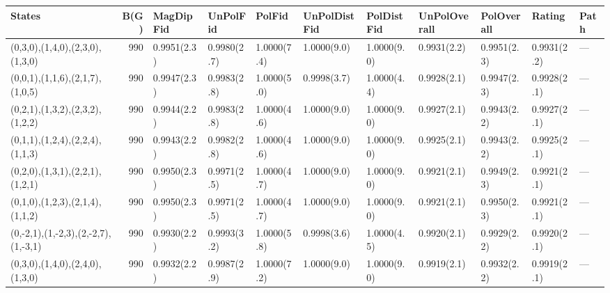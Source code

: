 \begin{tabular}{lrlllllllll}
\hline
 States                              &   B(G) & MagDipFid   & UnPolFid    & PolFid      & UnPolDistFid   & PolDistFid   & UnPolOverall   & PolOverall   & Rating      & Path   \\
\hline
 (0,3,0),(1,4,0),(2,3,0),(1,3,0)     &    990 & 0.9951(2.3) & 0.9980(2.7) & 1.0000(7.4) & 1.0000(9.0)    & 1.0000(9.0)  & 0.9931(2.2)    & 0.9951(2.3)  & 0.9931(2.2) & ---    \\
 (0,0,1),(1,1,6),(2,1,7),(1,0,5)     &    990 & 0.9947(2.3) & 0.9983(2.8) & 1.0000(5.0) & 0.9998(3.7)    & 1.0000(4.4)  & 0.9928(2.1)    & 0.9947(2.3)  & 0.9928(2.1) & ---    \\
 (0,2,1),(1,3,2),(2,3,2),(1,2,2)     &    990 & 0.9944(2.2) & 0.9983(2.8) & 1.0000(4.6) & 1.0000(9.0)    & 1.0000(9.0)  & 0.9927(2.1)    & 0.9943(2.2)  & 0.9927(2.1) & ---    \\
 (0,1,1),(1,2,4),(2,2,4),(1,1,3)     &    990 & 0.9943(2.2) & 0.9982(2.8) & 1.0000(4.6) & 1.0000(9.0)    & 1.0000(9.0)  & 0.9925(2.1)    & 0.9943(2.2)  & 0.9925(2.1) & ---    \\
 (0,2,0),(1,3,1),(2,2,1),(1,2,1)     &    990 & 0.9950(2.3) & 0.9971(2.5) & 1.0000(4.7) & 1.0000(9.0)    & 1.0000(9.0)  & 0.9921(2.1)    & 0.9949(2.3)  & 0.9921(2.1) & ---    \\
 (0,1,0),(1,2,3),(2,1,4),(1,1,2)     &    990 & 0.9950(2.3) & 0.9971(2.5) & 1.0000(4.7) & 1.0000(9.0)    & 1.0000(9.0)  & 0.9921(2.1)    & 0.9950(2.3)  & 0.9921(2.1) & ---    \\
 (0,-2,1),(1,-2,3),(2,-2,7),(1,-3,1) &    990 & 0.9930(2.2) & 0.9993(3.2) & 1.0000(5.8) & 0.9998(3.6)    & 1.0000(4.5)  & 0.9920(2.1)    & 0.9929(2.2)  & 0.9920(2.1) & ---    \\
 (0,3,0),(1,4,0),(2,4,0),(1,3,0)     &    990 & 0.9932(2.2) & 0.9987(2.9) & 1.0000(7.2) & 1.0000(9.0)    & 1.0000(9.0)  & 0.9919(2.1)    & 0.9932(2.2)  & 0.9919(2.1) & ---    \\
\hline
\end{tabular}